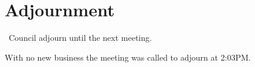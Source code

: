 \section*{Adjournment}

\begin{motion}
    \birt\ Council adjourn until the next meeting.

    With no new business the meeting was called to adjourn at 2:03PM.%
\end{motion}

